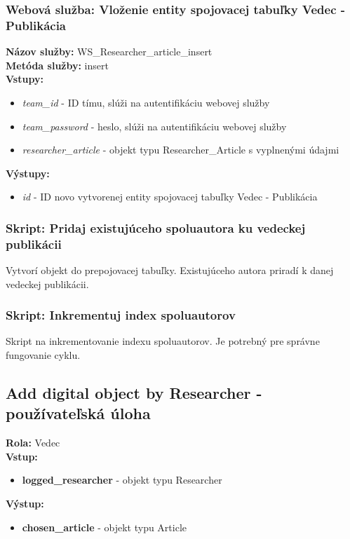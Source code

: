 \documentclass[10pt,oneside,slovak,a4paper]{article}
\begin{document}
\subsubsection{Webová služba: Vloženie entity spojovacej tabuľky Vedec - Publikácia}
\textbf{Názov služby:} WS\_Researcher\_article\_insert\\
\textbf{Metóda služby:} insert\\
\textbf{Vstupy:}
	\begin{itemize}
		\item \textit{team\_id} - ID tímu, slúži na autentifikáciu webovej služby
		\item \textit{team\_password} - heslo, slúži na autentifikáciu webovej služby
		\item \textit{researcher\_article} - objekt typu Researcher\_Article s vyplnenými údajmi
	\end{itemize}
\textbf{Výstupy:}
	\begin{itemize}
		\item \textit{id} - ID novo vytvorenej entity spojovacej tabuľky Vedec - Publikácia
	\end{itemize}
	
\subsubsection{Skript: Pridaj existujúceho spoluautora ku vedeckej publikácii}
Vytvorí objekt do prepojovacej tabuľky. Existujúceho autora priradí k danej vedeckej publikácii.

\subsubsection{Skript: Inkrementuj index spoluautorov}
Skript na inkrementovanie indexu spoluautorov. Je potrebný pre správne fungovanie cyklu.

\subsection{Add digital object by Researcher - používateľská úloha}
\textbf{Rola:} Vedec\\
\textbf{Vstup:}

\begin{itemize}
\item \textbf{logged\_researcher} - objekt typu Researcher
\end{itemize}

\textbf{Výstup:}

\begin{itemize}
\item \textbf{chosen\_article} - objekt typu Article
\end{itemize}
\end{document}
